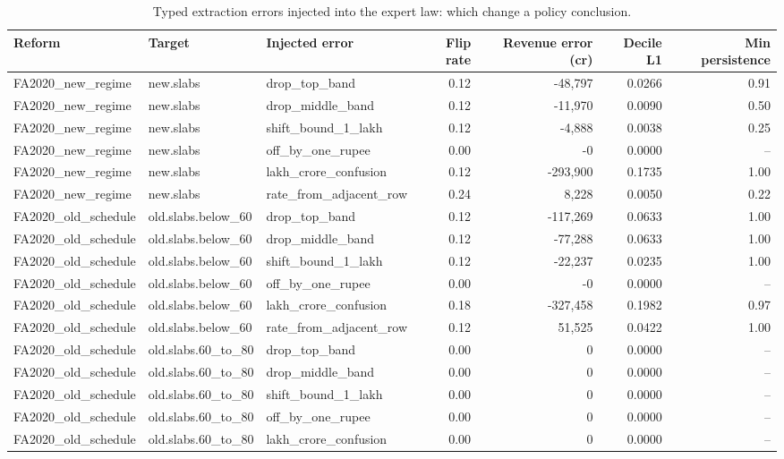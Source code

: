 \begin{table}[t]
\centering\small
\caption{Typed extraction errors injected into the expert law: which change a policy conclusion.}
\label{tab:error_injection}
\begin{tabular}{lllrrrr}
\toprule
Reform & Target & Injected error & Flip rate & Revenue error (cr) & Decile L1 & Min persistence \\
\midrule
FA2020\_new\_regime & new.slabs & drop\_top\_band & 0.12 & -48,797 & 0.0266 & 0.91 \\
FA2020\_new\_regime & new.slabs & drop\_middle\_band & 0.12 & -11,970 & 0.0090 & 0.50 \\
FA2020\_new\_regime & new.slabs & shift\_bound\_1\_lakh & 0.12 & -4,888 & 0.0038 & 0.25 \\
FA2020\_new\_regime & new.slabs & off\_by\_one\_rupee & 0.00 & -0 & 0.0000 & -- \\
FA2020\_new\_regime & new.slabs & lakh\_crore\_confusion & 0.12 & -293,900 & 0.1735 & 1.00 \\
FA2020\_new\_regime & new.slabs & rate\_from\_adjacent\_row & 0.24 & 8,228 & 0.0050 & 0.22 \\
FA2020\_old\_schedule & old.slabs.below\_60 & drop\_top\_band & 0.12 & -117,269 & 0.0633 & 1.00 \\
FA2020\_old\_schedule & old.slabs.below\_60 & drop\_middle\_band & 0.12 & -77,288 & 0.0633 & 1.00 \\
FA2020\_old\_schedule & old.slabs.below\_60 & shift\_bound\_1\_lakh & 0.12 & -22,237 & 0.0235 & 1.00 \\
FA2020\_old\_schedule & old.slabs.below\_60 & off\_by\_one\_rupee & 0.00 & -0 & 0.0000 & -- \\
FA2020\_old\_schedule & old.slabs.below\_60 & lakh\_crore\_confusion & 0.18 & -327,458 & 0.1982 & 0.97 \\
FA2020\_old\_schedule & old.slabs.below\_60 & rate\_from\_adjacent\_row & 0.12 & 51,525 & 0.0422 & 1.00 \\
FA2020\_old\_schedule & old.slabs.60\_to\_80 & drop\_top\_band & 0.00 & 0 & 0.0000 & -- \\
FA2020\_old\_schedule & old.slabs.60\_to\_80 & drop\_middle\_band & 0.00 & 0 & 0.0000 & -- \\
FA2020\_old\_schedule & old.slabs.60\_to\_80 & shift\_bound\_1\_lakh & 0.00 & 0 & 0.0000 & -- \\
FA2020\_old\_schedule & old.slabs.60\_to\_80 & off\_by\_one\_rupee & 0.00 & 0 & 0.0000 & -- \\
FA2020\_old\_schedule & old.slabs.60\_to\_80 & lakh\_crore\_confusion & 0.00 & 0 & 0.0000 & -- \\

\end{tabular}
\end{table}
